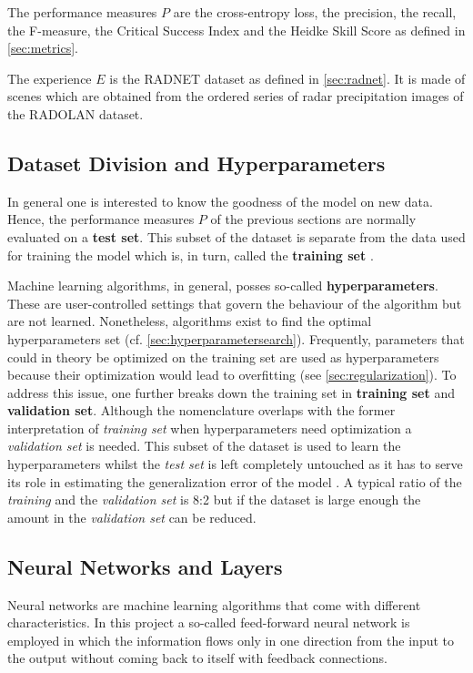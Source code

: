 The performance measures $P$ are the cross-entropy loss, the precision, the recall, the F-measure, the Critical Success Index and the Heidke Skill Score as defined in \cref{sec:metrics}.

The experience $E$ is the RADNET dataset as defined in \cref{sec:radnet}. It is made of scenes which are obtained from the ordered series of radar precipitation images of the RADOLAN dataset.

\subsection{Dataset Division and Hyperparameters} \label{sec:datasetdivision}
In general one is interested to know the goodness of the model on new data. Hence, the performance measures $P$ of the previous sections are normally evaluated on a \textbf{test set}. This subset of the dataset is separate from the data used for training the model which is, in turn, called the \textbf{training set} \citep{Goodfellow2016}.

Machine learning algorithms, in general, posses so-called \textbf{hyperparameters}. These are user-controlled settings that govern the behaviour of the algorithm but are not learned. Nonetheless, algorithms exist to find the optimal hyperparameters set (cf. \cref{sec:hyperparametersearch}). Frequently, parameters that could in theory be optimized on the training set are used as hyperparameters because their optimization would lead to overfitting (see \cref{sec:regularization}). To address this issue, one further breaks down the training set in \textbf{training set} and \textbf{validation set}. Although the nomenclature overlaps with the former interpretation of \textit{training set} when hyperparameters need optimization a \textit{validation set} is needed. This subset of the dataset is used to learn the hyperparameters whilst the \textit{test set} is left completely untouched as it has to serve its role in estimating the generalization error of the model \citep{Goodfellow2016}. A typical ratio of the \textit{training} and the \textit{validation set} is 8:2 but if the dataset is large enough the amount in the \textit{validation set} can be reduced.

\subsection{Neural Networks and Layers} \label{sec:nnlay}
Neural networks are machine learning algorithms that come with different characteristics. In this project a so-called feed-forward neural network is employed in which the information flows only in one direction from the input to the output without coming back to itself with feedback connections.

